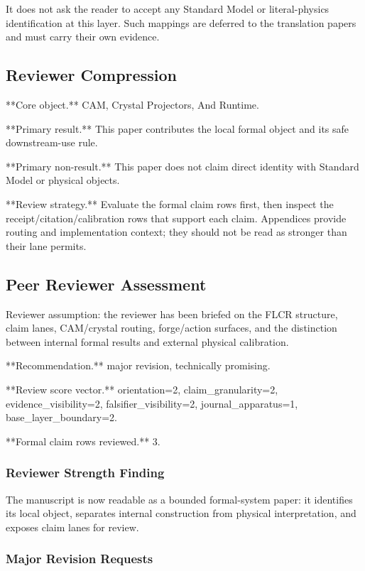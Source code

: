 \documentclass[11pt]{article}
\begin{document}
It does not ask the reader to accept any Standard Model or literal-physics identification at this layer. Such mappings are deferred to the translation papers and must carry their own evidence.

\subsection*{Reviewer Compression}

**Core object.** CAM, Crystal Projectors, And Runtime.

**Primary result.** This paper contributes the local formal object and its safe downstream-use rule.

**Primary non-result.** This paper does not claim direct identity with Standard Model or physical objects.

**Review strategy.** Evaluate the formal claim rows first, then inspect the receipt/citation/calibration rows that support each claim. Appendices provide routing and implementation context; they should not be read as stronger than their lane permits.

\subsection*{Peer Reviewer Assessment}

Reviewer assumption: the reviewer has been briefed on the FLCR structure, claim lanes, CAM/crystal routing, forge/action surfaces, and the distinction between internal formal results and external physical calibration.

**Recommendation.** major revision, technically promising.

**Review score vector.** orientation=2, claim\_granularity=2, evidence\_visibility=2, falsifier\_visibility=2, journal\_apparatus=1, base\_layer\_boundary=2.

**Formal claim rows reviewed.** 3.

\subsubsection*{Reviewer Strength Finding}

The manuscript is now readable as a bounded formal-system paper: it identifies its local object, separates internal construction from physical interpretation, and exposes claim lanes for review.

\subsubsection*{Major Revision Requests}
\end{document}
